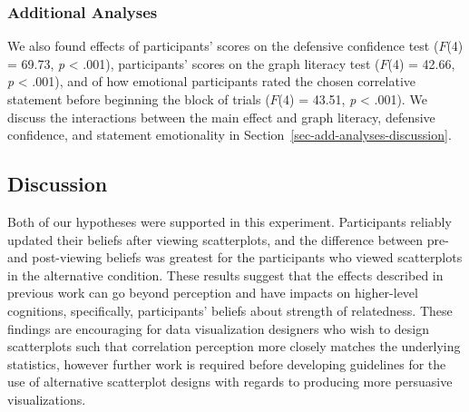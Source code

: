 \documentclass[manuscript,screen,review,anonymous]{acmart}
\begin{document}
\begin{table}

\caption{\label{tbl-condition-interact}Statistics for the significant
main effect of condition on the difference between pre- and post-
scatterplot viewing ratings for standard and alternative plots. Odds
ratios and equivalent Cohen's \emph{d} effect sizes are also shown.}


\end{table}%

\subsubsection{Additional Analyses}\label{sec-add-analyses}

We also found effects of participants' scores on the defensive
confidence test (\(F\)(4) = 69.73, \emph{p} \textless{} .001),
participants' scores on the graph literacy test (\(F\)(4) = 42.66,
\emph{p} \textless{} .001), and of how emotional participants rated the
chosen correlative statement before beginning the block of trials
(\(F\)(4) = 43.51, \emph{p} \textless{} .001). We discuss the
interactions between the main effect and graph literacy, defensive
confidence, and statement emotionality in
Section~\ref{sec-add-analyses-discussion}.

\subsection{Discussion}\label{sec-main-discussion}

Both of our hypotheses were supported in this experiment. Participants
reliably updated their beliefs after viewing scatterplots, and the
difference between pre- and post-viewing beliefs was greatest for the
participants who viewed scatterplots in the alternative condition. These
results suggest that the effects described in previous work can go
beyond perception and have impacts on higher-level cognitions,
specifically, participants' beliefs about strength of relatedness. These
findings are encouraging for data visualization designers who wish to
design scatterplots such that correlation perception more closely
matches the underlying statistics, however further work is required
before developing guidelines for the use of alternative scatterplot
designs with regards to producing more persuasive visualizations.
\end{document}
